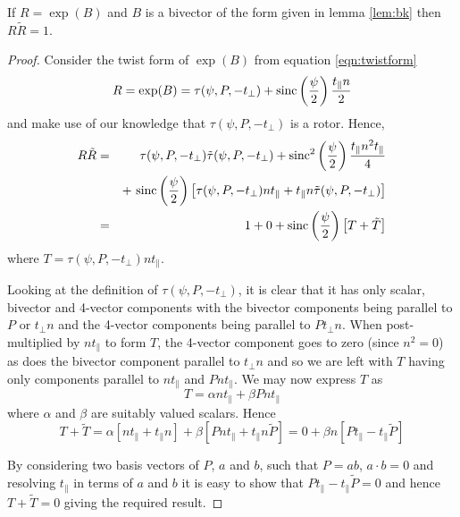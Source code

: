 \begin{thm} If $R = \exp(B)$ and $B$ is a bivector of the form 
given in lemma
\ref{lem:bk} then $R\tilde{R} = 1$.
\end{thm}
\begin{proof}
Consider the twist form of $\exp(B)$ from equation \ref{eqn:twistform}
\[
R = \exp(B) =
\tau(\psi, P, - t_\perp) + \mathrm{sinc}\left(\frac{\psi}{2}\right)\frac{t_\parallel n}{2}
\]
and make use of our knowledge that $\tau(\psi, P, - t_\perp)$ is a rotor.
Hence,
\begin{eqnarray*}
R\tilde{R} & = & \tau(\psi, P, - t_\perp)\tilde{\tau}(\psi, P, - t_\perp)
+ \mathrm{sinc}^2\left(\frac{\psi}{2}\right)
\frac{t_\parallel n^2 t_\parallel}{4}\\
&& + \ \mathrm{sinc}\left(\frac{\psi}{2}\right)
\left[ \tau(\psi, P, - t_\perp)nt_\parallel + 
       t_\parallel n\tilde{\tau}(\psi, P, - t_\perp) \right] \\
& = & 1 + 0 + \mathrm{sinc}\left(\frac{\psi}{2}\right)
\left[ T + \tilde{T} \right]
\end{eqnarray*}
where $T = \tau(\psi, P, - t_\perp)nt_\parallel$.

Looking at the definition of $\tau(\psi, P, - t_\perp)$, it is clear
that it has only scalar, bivector and 4-vector components with
the bivector components being parallel to $P$ or $t_\perp n$ and
the 4-vector components being parallel to $Pt_\perp n$. When
post-multiplied by $nt_\parallel$ to form $T$, the 4-vector component
goes to zero (since $n^2 = 0$) as does the bivector component
parallel to $t_\perp n$ and so we are left with $T$ having only
components parallel to $nt_\parallel$ and $Pnt_\parallel$. 
We may now express $T$ as
\[
T = \alpha nt_\parallel + \beta Pnt_\parallel
\]
where $\alpha$ and $\beta$ are suitably valued scalars. Hence
\[
T + \tilde{T} = \alpha \left[ nt_\parallel + t_\parallel n \right]
+ \beta \left[ Pnt_\parallel + t_\parallel n\tilde{P} \right] 
= 0 + \beta n \left[ Pt_\parallel - t_\parallel \tilde{P} \right]
\]

By considering two basis vectors of $P$, $a$ and $b$, such
that $P = ab$, $a \cdot b = 0$ and resolving $t_\parallel$ in 
terms of $a$ and $b$ it is easy to show that 
$Pt_\parallel - t_\parallel\tilde{P} = 0$ and hence
$T + \tilde{T} = 0$ giving the required result.
\end{proof}

